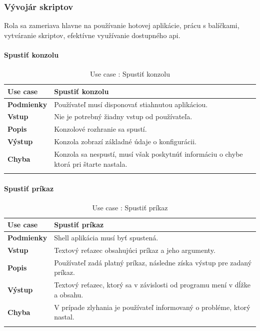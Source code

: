 \subsubsection{Vývojár skriptov}
\indent Rola sa zameriava hlavne na používanie hotovej aplikácie, prácu s balíčkami, vytváranie skriptov, efektívne využívanie dostupného \acrshort{api}. 
\paragraph{Spustiť konzolu}
\begin{center}
	\begin{longtable}{|p{2.5cm}|p{12.2cm}|}
		\hline
		\textbf{Use case} & Spustiť konzolu \\ 
		\hline
		\textbf{Podmienky} & Používateľ musí disponovať stiahnutou aplikáciou.\\
		\hline
		\textbf{Vstup} & Nie je potrebný žiadny vstup od používateľa.\\
		\hline
		\textbf{Popis} & Konzolové rozhranie sa spustí. \\ 
		\hline
		\textbf{Výstup} & Konzola zobrazí základné údaje o konfigurácii.\\
		\hline
		\textbf{Chyba} & Konzola sa nespustí, musí však poskytnúť informáciu o chybe ktorá pri štarte nastala.\\
		\hline
	\caption{Use case : Spustiť konzolu}
	\label{table:1}
	\end{longtable}
\end{center}

\paragraph{Spustiť príkaz}
\begin{center}
	\begin{longtable}{|p{2.5cm}|p{12.2cm}|}
		\hline
		\textbf{Use case} & Spustiť príkaz \\ 
		\hline
		\textbf{Podmienky} & Shell aplikácia musí byť spustená. \\ 
		\hline
		\textbf{Vstup} & Textový reťazec obsahujúci príkaz a jeho argumenty.\\
		\hline
		\textbf{Popis} & Používateľ zadá platný príkaz, následne získa výstup pre zadaný príkaz. \\ 
		\hline
		\textbf{Výstup} & Textový reťazec, ktorý sa v závislosti od programu mení v dĺžke a obsahu.\\
		\hline
		\textbf{Chyba} & V prípade zlyhania je používateľ informovaný o probléme, ktorý nastal.\\
		\hline
		\caption{Use case : Spustiť príkaz}
		\label{table:1}
	\end{longtable}
	
\end{center}
